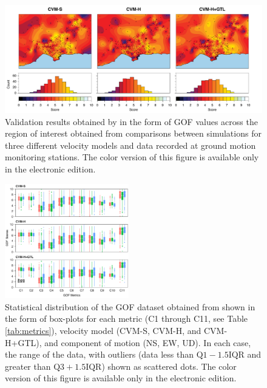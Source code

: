 \begin{figure}[t]
    \centering
    \includegraphics[width=\textwidth]{figures/pdf/figure-02}
    \caption{Validation results obtained by \citet{Taborda_2014_BSSA} in the form of GOF values across the region of interest obtained from comparisons between simulations for three different velocity models and data recorded at ground motion monitoring stations. The color version of this figure is available only in the electronic edition.}
    \label{fig:ref-gof-maps}
\end{figure}
% 
\begin{figure}[ht!]
    \centering
    \includegraphics[width=0.48\textwidth]{figures/pdf/figure-03}
    \caption{Statistical distribution of the GOF dataset obtained from \citet{Taborda_2014_BSSA} shown in the form of box-plots for each metric (C1 through C11, see Table \ref{tab:metrics}), velocity model (CVM-S, CVM-H, and CVM-H+GTL), and component of motion (NS, EW, UD). In each case,  the range of the data, with outliers (data less than $\mathrm{Q}1 - 1.5 \mathrm{IQR}$ and greater than $\mathrm{Q}3 + 1.5 \mathrm{IQR}$) shown as scattered dots. The color version of this figure is available only in the electronic edition.}
    \label{fig:data-box-plot}
\end{figure}


